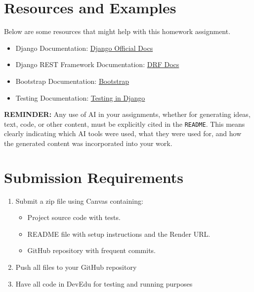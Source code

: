 \documentclass{article}
\begin{document}
\section{Resources and Examples}
Below are some resources that might help with this homework assignment. 

\begin{itemize}
    \item Django Documentation: \href{https://docs.djangoproject.com/en/stable/}{Django Official Docs}
    \item Django REST Framework Documentation: \href{https://www.django-rest-framework.org/}{DRF Docs}
    \item Bootstrap Documentation: \href{https://getbootstrap.com/docs/5.3/getting-started/introduction/}{Bootstrap}
    \item Testing Documentation: \href{https://docs.djangoproject.com/en/stable/topics/testing/}{Testing in Django}
\end{itemize}

\textbf{REMINDER:} Any use of AI in your assignments, whether for generating ideas, text, code, or other content, must be explicitly cited in the \texttt{README}.  This means clearly indicating which AI tools were used, what they were used for, and how the generated content was incorporated into your work.

\section{Submission Requirements}
\begin{enumerate}
    \item Submit a zip file using Canvas containing: \begin{itemize}
        \item Project source code with tests.
        \item README file with setup instructions and the Render URL.
        \item GitHub repository with frequent commits.
\end{itemize}
    \item Push all files to your GitHub repository
    \item Have all code in DevEdu for testing and running purposes
\end{enumerate}
\end{document}

